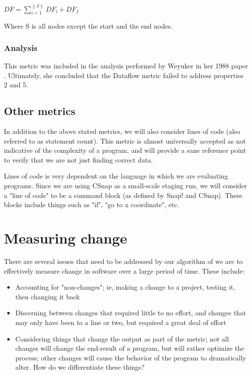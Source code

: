 \documentclass[]{article}
\begin{document}
$DF = \sum\limits_{i=1}^{\parallel S \parallel} DF_i+DF_f$

Where S is all nodes except the start and the end nodes.

\subsubsection{Analysis}

This metric was included in the analysis performed by Weyuker in her 1988 paper \cite{ref:evaluating_software_complexity_measures}.
Ultimately, she concluded that the Dataflow metric failed to address properties 2 and 5.

\subsection{Other metrics}

In addition to the above stated metrics, we will also consider lines of code (also referred to as statement count).
This metric is almost universally accepted as not indicative of the complexity of a program, and will provide a sane reference point to verify that we are not just finding correct data.

Lines of code is very dependent on the language in which we are evaluating programs.
Since we are using CSnap as a small-scale staging run, we will consider a "line of code" to be a command block (as defined by Snap! and CSnap).
These blocks include things such as "if", "go to {x coordinate}", etc.

\section{Measuring change}




There are several issues that need to be addressed by our algorithm of we are to effectively measure change in software over a large period of time.
These include:
\begin{itemize}
	\item Accounting for "non-changes"; ie, making a change to a project, testing it, then changing it back
	\item Discerning between changes that required little to no effort, and changes that may only have been to a line or two, but required a great deal of effort
	\item Considering things that change the output as part of the metric; not all changes will change the end-result of a program, but will rather optimize the process; other changes will cause the behavior of the program to dramatically alter. How do we differentiate these things?
\end{itemize}
\end{document}
